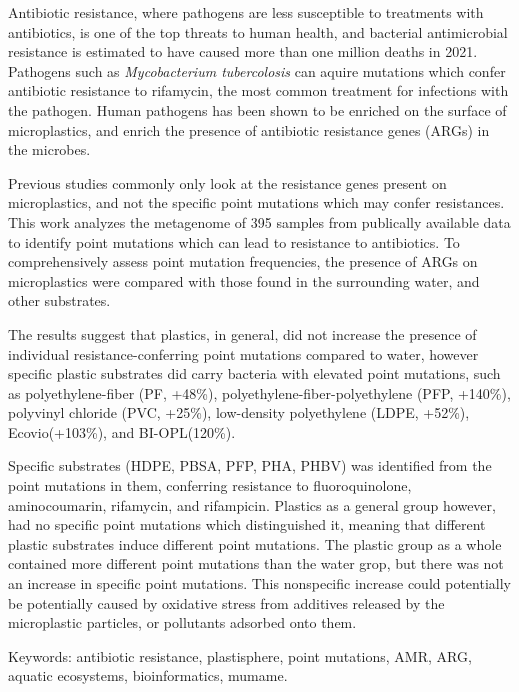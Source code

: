 % 
Antibiotic resistance, where pathogens are less susceptible to treatments with antibiotics, is one of the top threats to human health, and bacterial antimicrobial resistance is estimated to have caused more than one million deaths in 2021. 
Pathogens such as \emph{Mycobacterium tubercolosis} can aquire mutations which confer antibiotic resistance to rifamycin, the most common treatment for infections with the pathogen. 
Human pathogens has been shown to be enriched on the surface of microplastics, and enrich the presence of antibiotic resistance genes (ARGs) in the microbes.

Previous studies commonly only look at the resistance genes present on microplastics, and not the specific point mutations which may confer resistances.
This work analyzes the metagenome of 395 samples from publically available data to identify point mutations which can lead to resistance to antibiotics. 
To comprehensively assess point mutation frequencies, the presence of ARGs on microplastics were compared with those found in the surrounding water, and other substrates.

The results suggest that plastics, in general, did not increase the presence of individual resistance-conferring point mutations compared to water,
however specific plastic substrates did carry bacteria with elevated point mutations, such as polyethylene-fiber (PF, +48\%), polyethylene-fiber-polyethylene (PFP, +140\%), polyvinyl chloride (PVC, +25\%), low-density polyethylene (LDPE, +52\%), Ecovio(+103\%), and BI-OPL(120\%). 

Specific substrates (HDPE, PBSA, PFP, PHA, PHBV) was identified from the point mutations in them, conferring resistance to fluoroquinolone, aminocoumarin, rifamycin, and rifampicin.
Plastics as a general group however, had no specific point mutations which distinguished it, meaning that different plastic substrates induce different point mutations. 
The plastic group as a whole contained more different point mutations than the water grop, but there was not an increase in specific point mutations. 
This nonspecific increase could potentially be potentially caused by oxidative stress from additives released by the microplastic particles, or pollutants adsorbed onto them.

\vfill
Keywords: antibiotic resistance, plastisphere, point mutations, AMR, ARG, aquatic ecosystems, bioinformatics, mumame.

\newpage				%
\thispagestyle{empty}
\mbox{}
